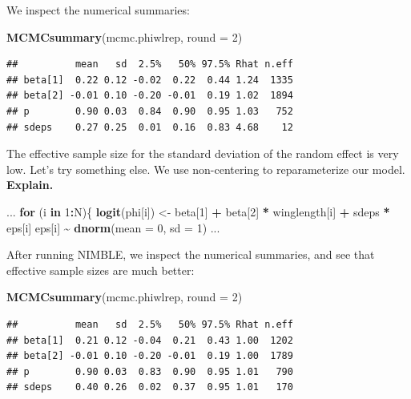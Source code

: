 \documentclass[
  12pt,
]{krantz}
\newenvironment{Shaded}{\begin{snugshade}}{\end{snugshade}}
\newcommand{\AttributeTok}[1]{\textcolor[rgb]{0.13,0.29,0.53}{#1}}
\newcommand{\ControlFlowTok}[1]{\textcolor[rgb]{0.13,0.29,0.53}{\textbf{#1}}}
\newcommand{\DecValTok}[1]{\textcolor[rgb]{0.00,0.00,0.81}{#1}}
\newcommand{\FunctionTok}[1]{\textcolor[rgb]{0.13,0.29,0.53}{\textbf{#1}}}
\newcommand{\NormalTok}[1]{#1}
\newcommand{\OtherTok}[1]{\textcolor[rgb]{0.56,0.35,0.01}{#1}}
\newcommand{\SpecialCharTok}[1]{\textcolor[rgb]{0.81,0.36,0.00}{\textbf{#1}}}
\begin{document}
We inspect the numerical summaries:

\begin{Shaded}
\begin{Highlighting}[]
\FunctionTok{MCMCsummary}\NormalTok{(mcmc.phiwlrep, }\AttributeTok{round =} \DecValTok{2}\NormalTok{)}
\end{Highlighting}
\end{Shaded}

\begin{verbatim}
##          mean   sd  2.5%   50% 97.5% Rhat n.eff
## beta[1]  0.22 0.12 -0.02  0.22  0.44 1.24  1335
## beta[2] -0.01 0.10 -0.20 -0.01  0.19 1.02  1894
## p        0.90 0.03  0.84  0.90  0.95 1.03   752
## sdeps    0.27 0.25  0.01  0.16  0.83 4.68    12
\end{verbatim}

The effective sample size for the standard deviation of the random effect is very low. Let's try something else. We use non-centering to reparameterize our model. \textbf{Explain.}

\begin{Shaded}
\begin{Highlighting}[]
\NormalTok{...}
  \ControlFlowTok{for}\NormalTok{ (i }\ControlFlowTok{in} \DecValTok{1}\SpecialCharTok{:}\NormalTok{N)\{}
    \FunctionTok{logit}\NormalTok{(phi[i]) }\OtherTok{\textless{}{-}}\NormalTok{ beta[}\DecValTok{1}\NormalTok{] }\SpecialCharTok{+}\NormalTok{ beta[}\DecValTok{2}\NormalTok{] }\SpecialCharTok{*}\NormalTok{ winglength[i] }\SpecialCharTok{+}\NormalTok{ sdeps }\SpecialCharTok{*}\NormalTok{ eps[i]}
\NormalTok{    eps[i] }\SpecialCharTok{\textasciitilde{}} \FunctionTok{dnorm}\NormalTok{(}\AttributeTok{mean =} \DecValTok{0}\NormalTok{, }\AttributeTok{sd =} \DecValTok{1}\NormalTok{)}
\NormalTok{...}
\end{Highlighting}
\end{Shaded}

After running NIMBLE, we inspect the numerical summaries, and see that effective sample sizes are much better:

\begin{Shaded}
\begin{Highlighting}[]
\FunctionTok{MCMCsummary}\NormalTok{(mcmc.phiwlrep, }\AttributeTok{round =} \DecValTok{2}\NormalTok{)}
\end{Highlighting}
\end{Shaded}

\begin{verbatim}
##          mean   sd  2.5%   50% 97.5% Rhat n.eff
## beta[1]  0.21 0.12 -0.04  0.21  0.43 1.00  1202
## beta[2] -0.01 0.10 -0.20 -0.01  0.19 1.00  1789
## p        0.90 0.03  0.83  0.90  0.95 1.01   790
## sdeps    0.40 0.26  0.02  0.37  0.95 1.01   170
\end{verbatim}
\end{document}
